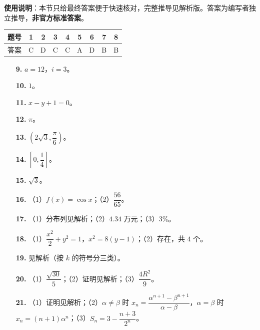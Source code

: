 
\begin{gknotice}
\textbf{使用说明}：本节只给最终答案便于快速核对，完整推导见解析版。答案为编写者独立推导，\textbf{非官方标准答案}。
\end{gknotice}

\begin{center}\begin{tabular}{ccccccccc}
\toprule
题号 & 1 & 2 & 3 & 4 & 5 & 6 & 7 & 8 \\
\midrule
答案 & C & D & C & C & A & D & B & B \\
\bottomrule
\end{tabular}\end{center}

\begin{itemize}[leftmargin=2.6em]
  \item[\textbf{9.}] $a=12$，$i=3$。
  \item[\textbf{10.}] $1$。
  \item[\textbf{11.}] $x-y+1=0$。
  \item[\textbf{12.}] $\pi$。
  \item[\textbf{13.}] $\left(2\sqrt3,\dfrac{\pi}6\right)$。
  \item[\textbf{14.}] $\left[0,\dfrac14\right]$。
  \item[\textbf{15.}] $\sqrt3$。
\end{itemize}

\begin{itemize}[leftmargin=2.6em]
  \item[\textbf{16.}] （1）$f(x)=\cos x$；（2）$\dfrac{56}{65}$。
  \item[\textbf{17.}] （1）分布列见解析；（2）$4.34$ 万元；（3）$3\%$。
  \item[\textbf{18.}] （1）$\dfrac{x^2}2+y^2=1$，$x^2=8(y-1)$；（2）存在，共 $4$ 个。
  \item[\textbf{19.}] 见解析（按 $k$ 的符号分三类）。
  \item[\textbf{20.}] （1）$\dfrac{\sqrt{30}}5$；（2）证明见解析；（3）$\dfrac{4R^2}9$。
  \item[\textbf{21.}] （1）证明见解析；（2）$\alpha\ne\beta$ 时 $x_n=\dfrac{\alpha^{n+1}-\beta^{n+1}}{\alpha-\beta}$，$\alpha=\beta$ 时 $x_n=(n+1)\alpha^n$；（3）$S_n=3-\dfrac{n+3}{2^n}$。
\end{itemize}
